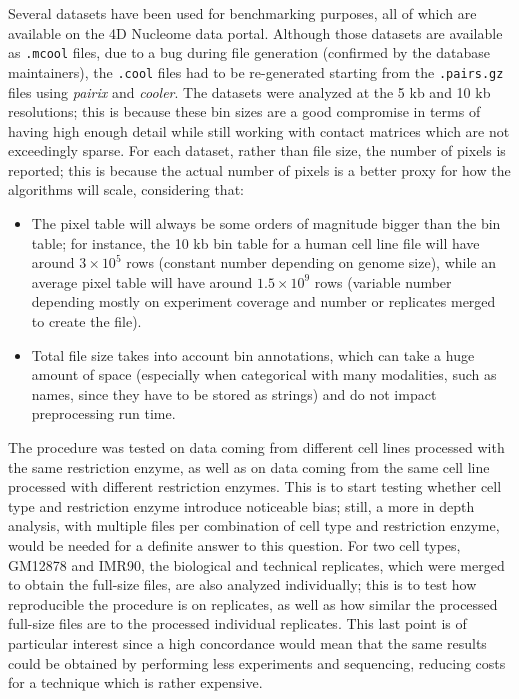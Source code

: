 Several datasets have been used for benchmarking purposes, all of which are available on the 4D Nucleome data portal\cite{4dn2022}. Although those datasets are available as \texttt{.mcool} files, due to a bug during file generation (confirmed by the database maintainers), the \texttt{.cool} files had to be re-generated starting from the \texttt{.pairs.gz} files using \emph{pairix}\cite{pairix2022} and
\emph{cooler}. The datasets were analyzed at the 5 kb and 10 kb resolutions; this is because these bin sizes are a good compromise in terms of having high enough detail while still working with contact matrices which are not exceedingly sparse. For each dataset, rather than file size, the number of pixels is reported; this is because the actual number of pixels is a better proxy for how the algorithms will scale, considering that: 
\begin{itemize}\tightlist
  \item The pixel table will always be some orders of magnitude bigger than the bin table; for instance, the 10 kb bin table for a human cell line file will have around $3 \times 10^5$ rows (constant number depending on genome size), while an average pixel table will have around $1.5 \times 10^9$ rows (variable number depending mostly on experiment coverage and number or replicates merged to create the file).
  \item Total file size takes into account bin annotations, which can take a huge amount of space (especially when categorical with many modalities, such as names, since they have to be stored as strings) and do not impact preprocessing run time.
\end{itemize}

The procedure was tested on data coming from different cell lines processed with the same restriction enzyme, as well as on data coming from the same cell line processed with different restriction enzymes. This is to start testing whether cell type and restriction enzyme introduce noticeable bias; still, a more in depth analysis, with multiple files per combination of cell type and restriction enzyme, would be needed for a definite answer to this question. For two cell types, GM12878 and IMR90, the biological and technical replicates, which were merged to obtain the full-size files, are also analyzed individually; this is to test how reproducible the procedure is on replicates, as well as how similar the processed full-size files are to the processed individual replicates. This last point is of particular interest since a high concordance would mean that the same results could be obtained by performing less experiments and sequencing, reducing costs for a technique which is rather expensive. 

